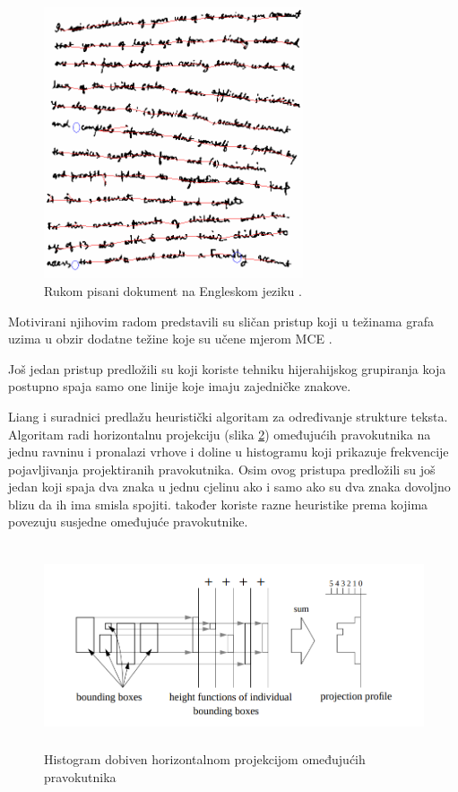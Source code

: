 \documentclass[times, utf8, zavrsni]{fer}
\begin{document}
\begin{figure}[htb]
    \centering
    \captionsetup{justification=centering}
    \includegraphics[height=8cm]{images/mst-example-01.png}
    \caption{
        Rukom pisani dokument na
        Engleskom jeziku \citep{yin2007handwritten}.
    }
    \label{fig:mst-example-01}
\end{figure}

Motivirani njihovim radom \citep{pan2011hybrid} predstavili su sličan pristup
koji u težinama grafa uzima u obzir dodatne težine koje su učene mjerom MCE
.

Još jedan pristup predložili su \citep{DBLP:journals/corr/abs-1301-2628} koji
koriste tehniku hijerahijskog grupiranja koja postupno spaja samo one linije
koje imaju zajedničke znakove.
\citep{DBLP:journals/corr/TianPHLYT16}

Liang i suradnici \citep{liang1996document} predlažu heuristički algoritam za
određivanje strukture teksta. Algoritam radi horizontalnu projekciju (slika
\ref{fig:histogram-projection}) omeđujućih pravokutnika na jednu ravninu i
pronalazi vrhove i doline u histogramu koji prikazuje frekvencije pojavljivanja
projektiranih pravokutnika. Osim ovog pristupa predložili su još jedan koji
spaja dva znaka u jednu cjelinu ako i samo ako su dva znaka dovoljno blizu da
ih ima smisla spojiti. \citep{gupta2006document} također
koriste razne heuristike prema kojima povezuju susjedne omeđujuće pravokutnike.

\pagebreak

\begin{figure}[htb]
    \centering
    \captionsetup{justification=centering,margin=2cm}
    \includegraphics[height=6cm]{images/histogram-projection.png}
    \caption{Histogram dobiven horizontalnom projekcijom omeđujućih pravokutnika \citep{liang1996document}}
    \label{fig:histogram-projection}
\end{figure}
\end{document}
